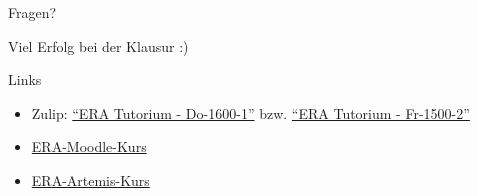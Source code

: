 \begin{frame}[c]{}{}
	\begin{center}
		\LARGE Fragen?
	\end{center}
\end{frame}


\begin{frame}[c]{}{}
	\begin{center}
		\LARGE Viel Erfolg bei der Klausur :)
	\end{center}
\end{frame}

\begin{frame}[c, fragile]{Links}{}
	\begin{itemize}
		\item Zulip: \href{https://zulip.in.tum.de/#narrow/stream/2661-ERA-Tutorium---Do-1600-1}{\enquote{ERA Tutorium - Do-1600-1}}
		      bzw. \href{https://zulip.in.tum.de/#narrow/stream/2675-ERA-Tutorium---Fr-1500-2 }{\enquote{ERA Tutorium - Fr-1500-2}}
		\item \href{https://www.moodle.tum.de/course/view.php?id=100633}{ERA-Moodle-Kurs}
		\item \href{https://artemis.in.tum.de/courses/401}{ERA-Artemis-Kurs}
	\end{itemize}
\end{frame}

\maketitle


